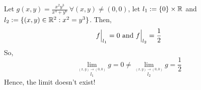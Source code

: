 Let $ g(x,y) = \frac{x^2y^3}{x^4+y^6} \ \forall (x,y) \not= (0,0) $, let $ l_1 := \{0\}\times\mathbb{R} $ and $ l_2 := \{(x,y) \in \mathbb{R}^2 : x^2=y^3 \} $.
Then, 
$$
f\Big|_{l_1} = 0 \ {\rm and} \ f\Big|_{l_2} = \frac{1}{2}
$$
So,
\[
  \lim_{\stackrel{(x,y) \to (0,0)}{l_1}} g = 0 \not= \lim_{\stackrel{(x,y) \to (0,0)}{l_2}} g = \frac{1}{2}
\]
Hence, the limit doesn't exist!